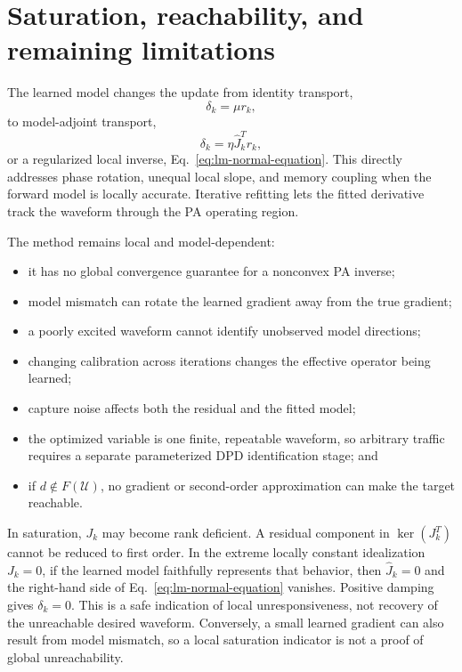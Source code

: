 \documentclass[10pt,a4paper]{article}
\newcommand{\Jhat}{\widehat J}
\begin{document}
\section{Saturation, reachability, and remaining limitations}

The learned model changes the update from identity transport,
\begin{equation}
  \delta_k=\mu r_k,
\end{equation}
to model-adjoint transport,
\begin{equation}
  \delta_k=\eta\Jhat_k^Tr_k,
\end{equation}
or a regularized local inverse, Eq.~\eqref{eq:lm-normal-equation}. This directly addresses phase rotation,
unequal local slope, and memory coupling when the forward model is locally accurate. Iterative refitting lets
the fitted derivative track the waveform through the PA operating region.

The method remains local and model-dependent:
\begin{itemize}
  \item it has no global convergence guarantee for a nonconvex PA inverse;
  \item model mismatch can rotate the learned gradient away from the true gradient;
  \item a poorly excited waveform cannot identify unobserved model directions;
  \item changing calibration across iterations changes the effective operator being learned;
  \item capture noise affects both the residual and the fitted model;
  \item the optimized variable is one finite, repeatable waveform, so arbitrary traffic requires a separate
  parameterized DPD identification stage; and
  \item if $d\notin F(\mathcal U)$, no gradient or second-order approximation can make the target reachable.
\end{itemize}

In saturation, $J_k$ may become rank deficient. A residual component in $\ker(J_k^T)$ cannot be reduced to
first order. In the extreme locally constant idealization $J_k=0$, if the learned model faithfully represents
that behavior, then $\Jhat_k=0$ and the right-hand side of Eq.~\eqref{eq:lm-normal-equation} vanishes. Positive
damping gives $\delta_k=0$. This is a safe indication of local unresponsiveness, not recovery of the
unreachable desired waveform. Conversely, a small learned gradient can also result from model mismatch, so a
local saturation indicator is not a proof of global unreachability.
\end{document}

